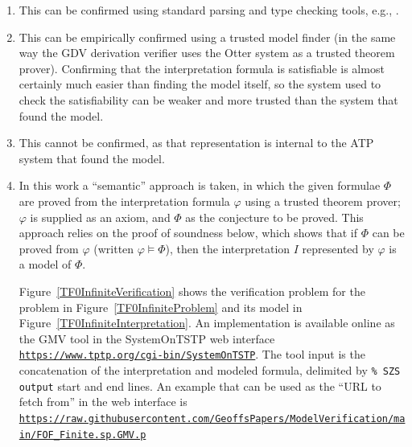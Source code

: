 \documentclass{easychair}
\newcommand{\smalltt}[1]{\small \texttt{#1}}
\begin{document}
\begin{enumerate}
\item This can be confirmed using standard parsing and type checking tools, e.g., \cite{VS06,HR15}.
\item This can be empirically confirmed using a trusted model finder (in the same way the GDV 
      derivation verifier \cite{Sut06} uses the Otter system \cite{McC03-Otter} as a trusted 
      theorem prover).
      Confirming that the interpretation formula is satisfiable is almost certainly much 
      easier than finding the model itself, so the system used to check the satisfiability can 
      be weaker and more trusted than the system that found the model.
\item This cannot be confirmed, as that representation is internal to the ATP system that found
      the model.
\item In this work a ``semantic'' approach is taken, in which the given formulae $\Phi$ are proved 
      from the interpretation formula $\varphi$ using a trusted theorem prover; $\varphi$ is 
      supplied as an axiom, and $\Phi$ as the conjecture to be proved.
      This approach relies on the proof of soundness below, which shows that if $\Phi$ can be 
      proved from $\varphi$ (written $\varphi \models \Phi$), then the interpretation $I$ 
      represented by $\varphi$ is a model of $\Phi$.

      Figure~\ref{TF0InfiniteVerification} shows the verification problem for the problem in 
      Figure~\ref{TF0InfiniteProblem} and its model in Figure~\ref{TF0InfiniteInterpretation}.
      An implementation is available online as the GMV tool in the SystemOnTSTP \cite{Sut07-CSR} 
      web interface {\smalltt{\url{https://www.tptp.org/cgi-bin/SystemOnTSTP}}}.
      The tool input is the concatenation of the interpretation and modeled formula,
      delimited by {\smalltt{\% SZS output}} start and end lines.
      An example that can be used as the ``URL to fetch from'' in the web interface is
      {\smalltt{\url{https://raw.githubusercontent.com/GeoffsPapers/ModelVerification/main/FOF_Finite.sp.GMV.p}}}
\end{enumerate}
\end{document}
